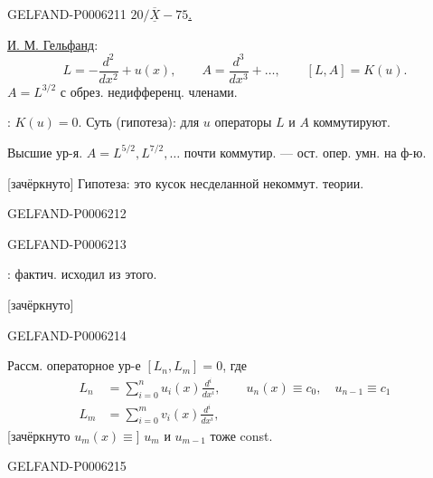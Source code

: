 \begin{GelfandAdjacentEvidence}{GELFAND-P000621}{1}
\underline{\(20/\overline{\underline X}-75\).}\qquad{}

\underline{И. М. Гельфанд}:
\[
L=-\frac{d^2}{dx^2}+u(x),\qquad
A=\frac{d^3}{dx^3}+\ldots,\qquad[L,A]=K(u).
\]
\(A=L^{3/2}\) с обрез. недифференц. членами.

: \(K(u)=0\).
Суть (гипотеза): для \(u\) операторы \(L\) и \(A\) коммутируют.

Высшие ур-я. \(A=L^{5/2},L^{7/2},\ldots\)\quad
почти коммутир. — ост. опер. умн. на ф-ю.

[зачёркнуто] Гипотеза: это кусок несделанной некоммут. теории.
\end{GelfandAdjacentEvidence}
\begin{GelfandAdjacentEvidence}{GELFAND-P000621}{2}

\end{GelfandAdjacentEvidence}
\begin{GelfandAdjacentEvidence}{GELFAND-P000621}{3}

: фактич. исходил из этого.

[зачёркнуто] 
\end{GelfandAdjacentEvidence}
\begin{GelfandAdjacentEvidence}{GELFAND-P000621}{4}

Рассм. операторное ур-е \([L_n,L_m]=0\), где
\[
\begin{aligned}
L_n&=\sum_{i=0}^{n}u_i(x)\frac{d^i}{dx^i},\qquad u_n(x)\equiv c_0,\quad u_{n-1}\equiv c_1\\
L_m&=\sum_{i=0}^{m}v_i(x)\frac{d^i}{dx^i},
\end{aligned}
\]
[зачёркнуто \sout{\(u_m(x)\equiv\)}] \(u_m\) и \(u_{m-1}\) тоже const.
\end{GelfandAdjacentEvidence}
\begin{GelfandAdjacentEvidence}{GELFAND-P000621}{5}

\end{GelfandAdjacentEvidence}
